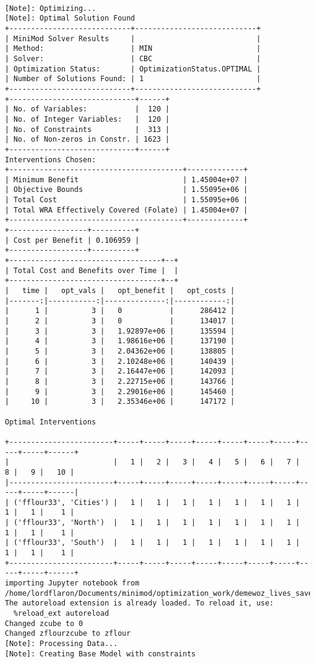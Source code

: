 \documentclass[
]{article}
\begin{document}
\begin{verbatim}
                
[Note]: Optimizing...
[Note]: Optimal Solution Found
+----------------------------+----------------------------+
| MiniMod Solver Results     |                            |
| Method:                    | MIN                        |
| Solver:                    | CBC                        |
| Optimization Status:       | OptimizationStatus.OPTIMAL |
| Number of Solutions Found: | 1                          |
+----------------------------+----------------------------+
+-----------------------------+------+
| No. of Variables:           |  120 |
| No. of Integer Variables:   |  120 |
| No. of Constraints          |  313 |
| No. of Non-zeros in Constr. | 1623 |
+-----------------------------+------+
Interventions Chosen:
+----------------------------------------+-------------+
| Minimum Benefit                        | 1.45004e+07 |
| Objective Bounds                       | 1.55095e+06 |
| Total Cost                             | 1.55095e+06 |
| Total WRA Effectively Covered (Folate) | 1.45004e+07 |
+----------------------------------------+-------------+
+------------------+----------+
| Cost per Benefit | 0.106959 |
+------------------+----------+
+-----------------------------------+--+
| Total Cost and Benefits over Time |  |
+-----------------------------------+--+
|   time |   opt_vals |   opt_benefit |   opt_costs |
|-------:|-----------:|--------------:|------------:|
|      1 |          3 |   0           |      286412 |
|      2 |          3 |   0           |      134017 |
|      3 |          3 |   1.92897e+06 |      135594 |
|      4 |          3 |   1.98616e+06 |      137190 |
|      5 |          3 |   2.04362e+06 |      138805 |
|      6 |          3 |   2.10248e+06 |      140439 |
|      7 |          3 |   2.16447e+06 |      142093 |
|      8 |          3 |   2.22715e+06 |      143766 |
|      9 |          3 |   2.29016e+06 |      145460 |
|     10 |          3 |   2.35346e+06 |      147172 |

Optimal Interventions

+------------------------+-----+-----+-----+-----+-----+-----+-----+-----+-----+------+
|                        |   1 |   2 |   3 |   4 |   5 |   6 |   7 |   8 |   9 |   10 |
|------------------------+-----+-----+-----+-----+-----+-----+-----+-----+-----+------|
| ('fflour33', 'Cities') |   1 |   1 |   1 |   1 |   1 |   1 |   1 |   1 |   1 |    1 |
| ('fflour33', 'North')  |   1 |   1 |   1 |   1 |   1 |   1 |   1 |   1 |   1 |    1 |
| ('fflour33', 'South')  |   1 |   1 |   1 |   1 |   1 |   1 |   1 |   1 |   1 |    1 |
+------------------------+-----+-----+-----+-----+-----+-----+-----+-----+-----+------+
importing Jupyter notebook from /home/lordflaron/Documents/minimod/optimization_work/demewoz_lives_saved/zinc_effective_coverage_analysis.ipynb
The autoreload extension is already loaded. To reload it, use:
  %reload_ext autoreload
Changed zcube to 0
Changed zflourzcube to zflour
[Note]: Processing Data...
[Note]: Creating Base Model with constraints


\end{verbatim}
\end{document}
